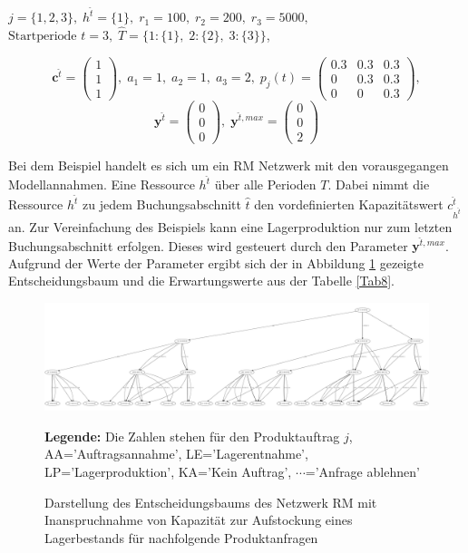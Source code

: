 \begin{center}
$j = \{1, 2, 3\}, \; h^{\hat{t}} = \{1\}, \; r_{1} = 100, \; r_{2} = 200, \; r_{3} = 5000,$ \\
$\text{Startperiode } t=3, \; \hat{T}= \{1: \{1\},\; 2: \{2\},\;3: \{3\} \} $,
\end{center}
\[
    \textbf{c}^{\hat{t}}=\begin{pmatrix} 1\\ 1\\ 1  \end{pmatrix}, \;
    a_{1}=1, \;
     a_{2}=1, \;
       a_{3}=2, \;
            p_{j}(t)=
       \begin{pmatrix}
       0.3 & 0.3 & 0.3 \\
0 & 0.3 & 0.3 \\
0 & 0 & 0.3
\end{pmatrix}, 
  \]
  \[
    \textbf{y}^{\hat{t}}= \begin{pmatrix} 0\\ 0\\ 0  \end{pmatrix}, \;
    \textbf{y}^{\hat{t},max}=\begin{pmatrix} 0\\ 0\\ 2  \end{pmatrix}
      \]

Bei dem Beispiel handelt es sich um ein RM Netzwerk mit den vorausgegangen Modellannahmen. Eine Ressource $h^{\hat{t}}$ über alle Perioden $T$. Dabei nimmt die Ressource $h^{\hat{t}}$ zu jedem Buchungsabschnitt $\hat{t}$ den vordefinierten Kapazitätswert $c^{\hat{t}}_{h^{\hat{t}}}$ an. Zur Vereinfachung des Beispiels kann eine Lagerproduktion nur zum letzten Buchungsabschnitt erfolgen. Dieses wird gesteuert durch den Parameter $\textbf{y}^{\hat{t},max}$. Aufgrund der Werte der Parameter ergibt sich der in Abbildung \ref{B8} gezeigte Entscheidungsbaum und die Erwartungswerte aus der Tabelle \ref{Tab8}.

\begin{figure}[h!]
  \begin{center}
    \includegraphics[width=200mm, angle=90]{Bilder/Beispiel8.pdf}
    \caption{Darstellung des Entscheidungsbaums des Netzwerk RM mit Inanspruchnahme von Kapazität zur Aufstockung eines Lagerbestands für nachfolgende Produktanfragen}  \label{B8}
    {\footnotesize \textbf{Legende:} Die Zahlen stehen für den Produktauftrag $j$, AA='Auftragsannahme', LE='Lagerentnahme', LP='Lagerproduktion', KA='Kein Auftrag', $\cdots$='Anfrage ablehnen'} 
  \end{center}
\end{figure}

